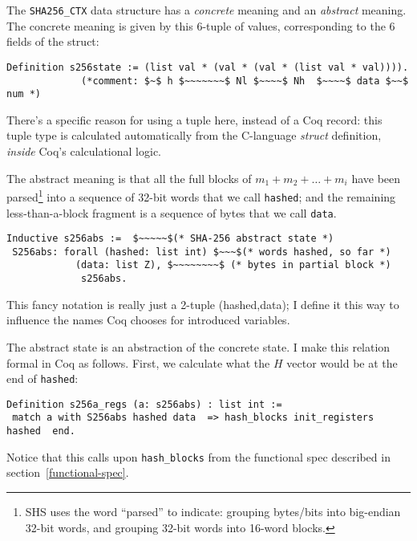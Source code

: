 \documentclass[prodmode,acmtoplas]{acmsmall}
\begin{document}
The \lstinline{SHA256_CTX} data structure
has a \emph{concrete} meaning
and an \emph{abstract} meaning.
The concrete meaning is given by this 6-tuple of values,
corresponding to the 6 fields of the struct:
\begin{lstlisting}
Definition s256state := (list val * (val * (val * (list val * val)))).
             (*comment: $~$ h $~~~~~~~$ Nl $~~~~$ Nh  $~~~~$ data $~~$  num *)
\end{lstlisting}
There's a specific reason for using a tuple here, instead of a Coq
record:  this tuple type is calculated automatically from
the C-language \emph{struct} definition, \emph{inside}
Coq's calculational logic.

The abstract meaning is that
all the full blocks of $m_1+m_2+\ldots+m_i$
have been
parsed\footnote{SHS uses the word ``parsed'' to indicate:
grouping bytes/bits into big-endian 32-bit words,
and grouping 32-bit words into 16-word blocks.}
into a sequence of 32-bit words that we call \lstinline{hashed};
and the remaining less-than-a-block
fragment is a sequence of bytes that we call \lstinline{data}.
\pagebreak
\begin{lstlisting}
Inductive s256abs :=  $~~~~~$(* SHA-256 abstract state *)
 S256abs: forall (hashed: list int) $~~~$(* words hashed, so far *)
            (data: list Z), $~~~~~~~~$ (* bytes in partial block *)
             s256abs.
\end{lstlisting}
This fancy notation is really just a 2-tuple (hashed,data);
I define it this way to influence the names Coq chooses
for introduced variables.

The abstract state is an abstraction of the concrete state.
I make this relation formal in Coq as follows.
First, we calculate what the $H$ vector
would be at the end of \lstinline{hashed}:
\begin{lstlisting}
Definition s256a_regs (a: s256abs) : list int :=
 match a with S256abs hashed data  => hash_blocks init_registers hashed  end.
\end{lstlisting}
Notice that this calls upon \lstinline{hash_blocks}
from the functional spec described in section~\ref{functional-spec}.
\end{document}
